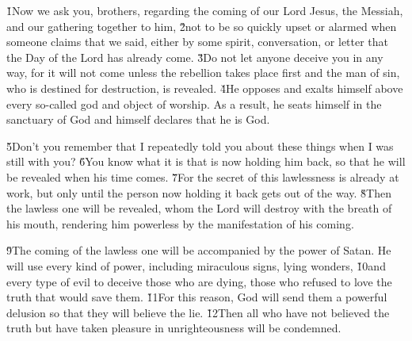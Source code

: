\v{1}Now we ask you, brothers, regarding the coming of our Lord Jesus, the Messiah, and our gathering together to him, \v{2}not to be so quickly upset or alarmed when someone claims that we said, either by some spirit, conversation, or letter that the Day of the Lord has already come. \v{3}Do not let anyone deceive you in any way, for it will not come unless the rebellion takes place first and the man of sin, who is destined for destruction, is revealed. \v{4}He opposes and exalts himself above every so-called god and object of worship. As a result, he seats himself in the sanctuary of God and himself declares that he is God.

\v{5}Don't you remember that I repeatedly told you about these things when I was still with you? \v{6}You know what it is that is now holding him back, so that he will be revealed when his time comes. \v{7}For the secret of this lawlessness is already at work, but only until the person now holding it back gets out of the way. \v{8}Then the lawless one will be revealed, whom the Lord will destroy with the breath of his mouth, rendering him powerless by the manifestation of his coming.

\v{9}The coming of the lawless one will be accompanied by the power of Satan. He will use every kind of power, including miraculous signs, lying wonders, \v{10}and every type of evil to deceive those who are dying, those who refused to love the truth that would save them. \v{11}For this reason, God will send them a powerful delusion so that they will believe the lie. \v{12}Then all who have not believed the truth but have taken pleasure in unrighteousness will be condemned.

